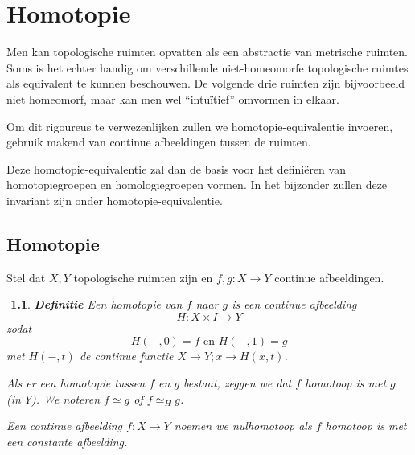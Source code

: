 \documentclass[12pt]{book}
\newtheorem{dfh}[stelh]{$\!\!$}
\newenvironment{df}{\begin{dfh} \em {\bf Definitie }}{\end{dfh}}
\begin{document}
\chapter{Homotopie}

Men kan topologische ruimten opvatten als een abstractie van metrische ruimten. Soms is het echter handig om verschillende niet-homeomorfe topologische ruimtes als equivalent te kunnen beschouwen. De volgende drie ruimten zijn bijvoorbeeld niet homeomorf, maar kan men wel ``intu\"itief'' omvormen in elkaar.

\begin{center}
\end{center}



Om dit rigoureus te  verwezenlijken zullen we homotopie-equivalentie invoeren, gebruik makend van continue afbeeldingen tussen de ruimten.


Deze homotopie-equivalentie zal dan de basis voor het defini\"eren van homotopiegroepen en homologiegroepen  vormen. In het bijzonder zullen deze invariant zijn onder homotopie-equivalentie.

\section{Homotopie}
Stel dat $X,Y$ topologische ruimten zijn en
$f,g:X\to Y$ continue afbeeldingen.

\begin{df}
Een  {\em homotopie} van $f$ naar $g$ is een continue afbeelding
$$H:X\times I \to Y$$
zodat
$$H(-,0)=f \mbox{ en } H(-,1)=g$$
met $H(-, t)$ de continue functie $X\to Y; x\to H(x,t)$.

Als er een homotopie tussen $f$ en $g$ bestaat, zeggen we dat $f$ {\em homotoop} is met $g$ (in $Y$). We
noteren $f\simeq g$ of $f\simeq_{H} g$.

Een continue afbeelding $f:X\to Y$ noemen we {\em nulhomotoop} als $f$ homotoop is met een constante afbeelding.
\end{df}
\end{document}
